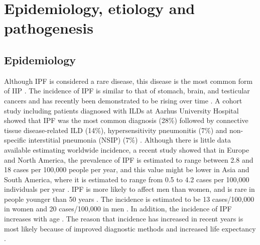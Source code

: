 \section{Epidemiology, etiology and pathogenesis} 
\subsection{Epidemiology}
Although IPF is considered a rare disease, this disease is the most common form of IIP \citep{travis2013official}. The incidence of IPF is similar to that of stomach, brain, and testicular cancers and has recently been demonstrated to be rising over time \citep{richeldi2017idiopathic}. A cohort study including patients diagnosed with ILDs at Aarhus University Hospital showed that IPF was the most common diagnosis (28\%) followed by connective tissue disease-related ILD (14\%), hypersensitivity pneumonitis (7\%) and non-specific interstitial pneumonia (NSIP) (7\%) \citep{hyldgaard2014cohort}. Although there is little data available estimating worldwide incidence, a recent study showed that in Europe and North America, the prevalence of IPF is estimated to range between 2.8 and 18 cases per 100,000 people per year, and this value might be lower in Asia and South America, where it is estimated to range from 0.5 to 4.2 cases per 100,000 individuals per year \citep{richeldi2017idiopathic}. IPF is more likely to affect men than women, and is rare in people younger than 50 years \citep{raghu2011official, raghu2006incidence}. The incidence is estimated to be 13 cases/100,000 in women and 20 cases/100,000 in men \citep{xaubet2017idiopathic}. In addition, the incidence of IPF increases with age \citep{meltzer2008idiopathic}. The reason that incidence has increased in recent years is most likely because of improved diagnostic methods and increased life expectancy \citep{xaubet2017idiopathic}.

